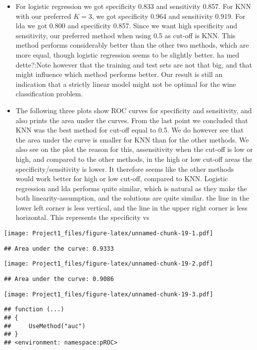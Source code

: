 \documentclass[]{article}
\begin{document}
\begin{itemize}
\item
  For logistic regression we got specificity 0.833 and sensitivity
  0.857. For KNN with our preferred \(K=3\), we got specificity 0.964
  and sensitivity 0.919. For lda we got 0.800 and specificity 0.857.
  Since we want high specificity and sensitivity, our preferred method
  when using 0.5 as cut-off is KNN. This method performs considerably
  better than the other two methods, which are more equal, though
  logistic regression seems to be slightly better. ha med dette?:Note
  however that the training and test sets are not that big, and that
  might influence which method performs better. Our result is still an
  indication that a strictly linear model might not be optimal for the
  wine classification problem.
\item
  The following three plots show ROC curves for specificity and
  sensitivity, and also prints the area under the curves. From the last
  point we concluded that KNN was the best method for cut-off equal to
  0.5. We do however see that the area under the curve is smaller for
  KNN than for the other methods. We also see on the plot the reason for
  this, assensitivity when the cut-off is low or high, and compared to
  the other methods, in the high or low cut-off areas the
  specificity/sensitivity is lower. It therefore seems like the other
  methods would work better for high or low cut-off, compared to KNN.
  Logistic regression and lda performs quite similar, which is natural
  as they make the both linearity-assumption, and the solutions are
  quite similar. the line in the lower left corner is less vertical, and
  the line in the upper right corner is less horizontal. This represents
  the specificity vs
\end{itemize}

\texttt{[image: Project1\_files/figure-latex/unnamed-chunk-19-1.pdf]}

\begin{verbatim}
## Area under the curve: 0.9333
\end{verbatim}

\texttt{[image: Project1\_files/figure-latex/unnamed-chunk-19-2.pdf]}

\begin{verbatim}
## Area under the curve: 0.9086
\end{verbatim}

\texttt{[image: Project1\_files/figure-latex/unnamed-chunk-19-3.pdf]}

\begin{verbatim}
## function (...) 
## {
##     UseMethod("auc")
## }
## <environment: namespace:pROC>
\end{verbatim}
\end{document}
